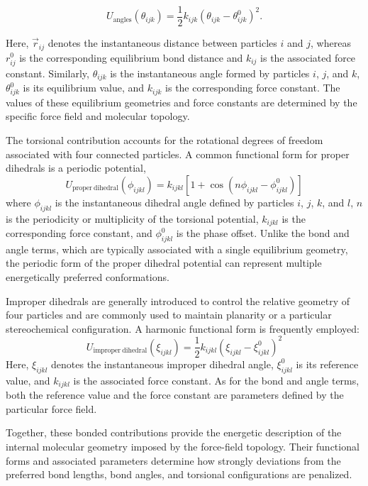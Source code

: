 \begin{equation}
U_{\mathrm{angles}}(\theta_{ijk}) =
\frac{1}{2} k_{ijk}
\left(
\theta_{ijk} - \theta_{ijk}^{0}
\right)^2.
\label{eq:angle}
\end{equation}

Here, $\vec{r}_{ij}$ denotes the instantaneous distance between particles $i$ and $j$, whereas $r_{ij}^{0}$ is the corresponding equilibrium bond distance and $k_{ij}$ is the associated force constant. Similarly, $\theta_{ijk}$ is the instantaneous angle formed by particles $i$, $j$, and $k$, $\theta_{ijk}^{0}$ is its equilibrium value, and $k_{ijk}$ is the corresponding force constant. The values of these equilibrium geometries and force constants are determined by the specific force field and molecular topology.

The torsional contribution accounts for the rotational degrees of freedom associated with four connected particles. A common functional form for proper dihedrals is a periodic potential,
\begin{equation}
U_{\mathrm{proper\ dihedral}}(\phi_{ijkl}) =
k_{ijkl}
\left[
1 + \cos
\left(
n\phi_{ijkl} - \phi_{ijkl}^{0}
\right)
\right]
\end{equation}
where $\phi_{ijkl}$ is the instantaneous dihedral angle defined by particles $i$, $j$, $k$, and $l$, $n$ is the periodicity or multiplicity of the torsional potential, $k_{ijkl}$ is the corresponding force constant, and $\phi_{ijkl}^{0}$ is the phase offset. Unlike the bond and angle terms, which are typically associated with a single equilibrium geometry, the periodic form of the proper dihedral potential can represent multiple energetically preferred conformations.

Improper dihedrals are generally introduced to control the relative geometry of four particles and are commonly used to maintain planarity or a particular stereochemical configuration. A harmonic functional form is frequently employed:
\begin{equation}
U_{\mathrm{improper\ dihedral}}(\xi_{ijkl}) =
\frac{1}{2} k_{ijkl}
\left(
\xi_{ijkl} - \xi_{ijkl}^{0}
\right)^2
\end{equation}
Here, $\xi_{ijkl}$ denotes the instantaneous improper dihedral angle, $\xi_{ijkl}^{0}$ is its reference value, and $k_{ijkl}$ is the associated force constant. As for the bond and angle terms, both the reference value and the force constant are parameters defined by the particular force field.

Together, these bonded contributions provide the energetic description of the internal molecular geometry imposed by the force-field topology. Their functional forms and associated parameters determine how strongly deviations from the preferred bond lengths, bond angles, and torsional configurations are penalized.




